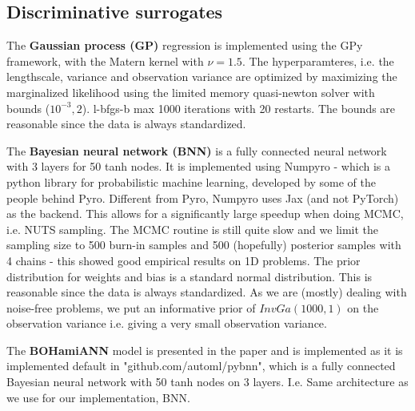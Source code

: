 \subsection{Discriminative surrogates}
The \textbf{Gaussian process (GP)} regression is implemented using the GPy framework, with the Matern kernel with
$\nu=1.5$. The hyperparamteres, i.e. the lengthscale, variance and observation variance are
optimized by maximizing the marginalized likelihood using the limited memory quasi-newton solver
with bounds ($10^{-3}, 2$). l-bfgs-b max 1000 iterations with 20 restarts. 
The bounds are reasonable since the data is always standardized. 

The \textbf{Bayesian neural network (BNN)} is a fully connected neural network with 3 layers for 50 tanh
nodes. It is implemented using Numpyro - which is a python library for probabilistic machine
learning, developed by some of the people behind Pyro. Different from Pyro, Numpyro uses Jax (and
not PyTorch) as the backend. This allows for a significantly large speedup when doing MCMC, i.e.
NUTS sampling. The MCMC routine is still quite slow and we limit the sampling size to 500 burn-in
samples and 500 (hopefully) posterior samples with 4 chains - this showed good empirical results on
1D problems. The prior distribution for weights and bias is a standard normal distribution. This is
reasonable since the data is always standardized. As we are (mostly) dealing with noise-free problems, 
we put an informative prior of $InvGa(1000,1)$ on the observation variance i.e. giving a very small observation
variance. 

The \textbf{BOHamiANN} model is presented in the paper \cite{BOHAMIANN} and is implemented as it is implemented default
in "github.com/automl/pybnn", which is a fully connected Bayesian neural network with 50 tanh nodes on 3 layers. 
I.e. Same architecture as we use for our implementation, BNN. 

